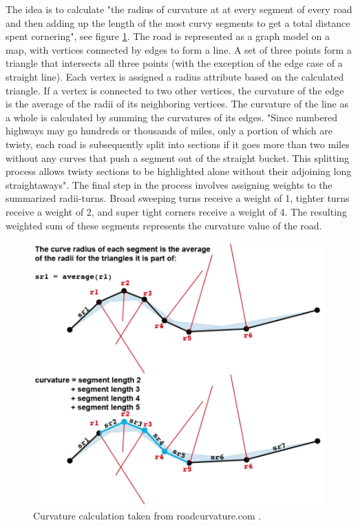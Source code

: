 The idea is to calculate "the radius of curvature at at every segment of every road and then adding up the length of the most curvy segments to get a total distance spent cornering"\cite{roadcurvature.com}, see figure \ref{fig:radiicalculation}. The road is represented as a graph model on a map, with vertices connected by edges to form a line. A set of three points form a triangle that intersects all three points (with the exception of the edge case of a straight line). Each vertex is assigned a radius attribute based on the calculated triangle. If a vertex is connected to two other vertices, the curvature of the edge is the average of the radii of its neighboring vertices. The curvature of the line as a whole is calculated by summing the curvatures of its edges. "Since numbered highways may go hundreds or thousands of miles, only a portion of which are twisty, each road is subsequently split into sections if it goes more than two miles without any curves that push a segment out of the straight bucket. This splitting process allows twisty sections to be highlighted alone without their adjoining long straightaways\cite{roadcurvature.com}". The final step in the process involves assigning weights to the summarized radii-turns. Broad sweeping turns receive a weight of 1, tighter turns receive a weight of 2, and super tight corners receive a weight of 4. The resulting weighted sum of these segments represents the curvature value of the road.

\begin{figure}[h]
\centering
    \includegraphics[width=0.8\linewidth]{images/radii.png}
    \caption{Curvature calculation taken from roadcurvature.com \cite{roadcurvature.com}.}
    \label{fig:radiicalculation}
\end{figure}


